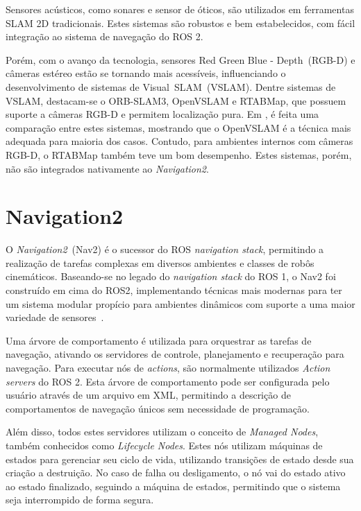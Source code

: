 \documentclass[repeatfields,xlists,xpacks,oneside,yearsonly]{ufrgscca}
\begin{document}
Sensores acústicos, como sonares e sensor de óticos, são utilizados
em ferramentas SLAM 2D tradicionais. Estes sistemas são robustos e
bem estabelecidos, com fácil integração ao sistema de navegação do
ROS 2.

Porém, com o avanço da tecnologia, sensores Red Green Blue -
Depth~(RGB-D) e câmeras estéreo estão se tornando mais acessíveis,
influenciando o desenvolvimento de sistemas de Visual~SLAM~(VSLAM).
Dentre sistemas de VSLAM, destacam-se o ORB-SLAM3, OpenVSLAM e
RTABMap, que possuem suporte a câmeras RGB-D e permitem localização
pura. Em \textcite{VSLAM}, é feita uma comparação entre estes
sistemas, mostrando que o OpenVSLAM é a técnica mais adequada para
maioria dos casos. Contudo, para ambientes internos com câmeras
RGB-D, o RTABMap também teve um bom desempenho. Estes sistemas,
porém, não são integrados nativamente ao \textit{Navigation2}.


\section{Navigation2}

O \textit{Navigation2}~(Nav2) é o sucessor do ROS \textit{navigation
    stack}, permitindo a realização de tarefas complexas em diversos
ambientes e classes de robôs cinemáticos. Baseando-se no legado do
\textit{navigation stack} do ROS 1, o Nav2 foi construído em cima do
ROS2, implementando técnicas mais modernas para ter um sistema
modular propício para ambientes dinâmicos com suporte a uma maior
variedade de sensores~\cite{Nav2}.

Uma árvore de comportamento é utilizada para orquestrar as tarefas de
navegação, ativando os servidores de controle, planejamento e
recuperação para navegação. Para executar nós de \textit{actions},
são normalmente utilizados \textit{Action servers} do ROS 2. Esta
árvore de comportamento pode ser configurada pelo usuário através de
um arquivo em XML, permitindo a descrição de comportamentos de
navegação únicos sem necessidade de programação.

Além disso, todos estes servidores utilizam o conceito de
\textit{Managed Nodes}, também conhecidos como \textit{Lifecycle
    Nodes}. Estes nós utilizam máquinas de estados para gerenciar seu
ciclo de vida, utilizando transições de estado desde sua criação a
destruição. No caso de falha ou desligamento, o nó vai do estado
ativo ao estado finalizado, seguindo a máquina de estados, permitindo
que o sistema seja interrompido de forma segura.
\end{document}
